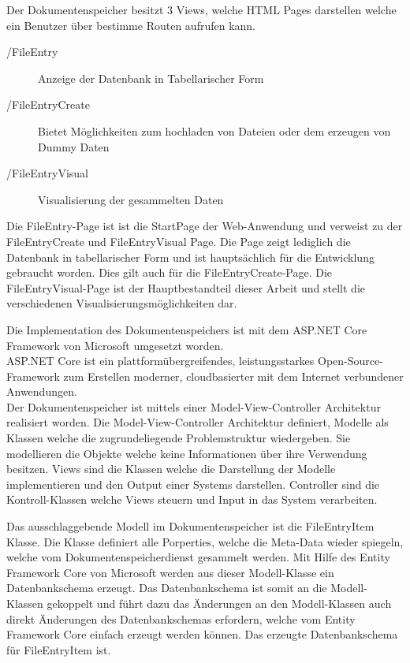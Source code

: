 \documentclass[
    fontsize=12pt,
    headings=small,
    parskip=half,           %
    bibliography=totoc,
    numbers=noenddot,       %
    open=any,               %
    ]{scrreprt}
\begin{document}
Der Dokumentenspeicher besitzt 3 Views, welche HTML Pages darstellen welche ein Benutzer über bestimme Routen aufrufen kann. 

\begin{description}
\item[/FileEntry] Anzeige der Datenbank in Tabellarischer Form
\item[/FileEntryCreate] Bietet Möglichkeiten zum hochladen von Dateien oder dem erzeugen von Dummy Daten
\item[/FileEntryVisual] Visualisierung der gesammelten Daten
\end{description}

Die FileEntry-Page ist ist die StartPage der Web-Anwendung und verweist zu der FileEntryCreate und FileEntryVisual Page.
Die Page zeigt lediglich die Datenbank in tabellarischer Form und ist hauptsächlich für die Entwicklung gebraucht worden. 
Dies gilt auch für die FileEntryCreate-Page. 
Die FileEntryVisual-Page ist der Hauptbestandteil dieser Arbeit und stellt die verschiedenen Visualisierungsmöglichkeiten dar. 







Die Implementation des Dokumentenspeichers ist mit dem ASP.NET Core Framework von Microsoft umgesetzt worden. \\
\glqq ASP.NET Core ist ein plattformübergreifendes, leistungsstarkes Open-Source-Framework zum Erstellen moderner, cloudbasierter mit dem Internet verbundener Anwendungen.\grqq \\
Der Dokumentenspeicher ist mittels einer Model-View-Controller Architektur realisiert worden. Die Model-View-Controller Architektur definiert, Modelle als Klassen welche die zugrundeliegende Problemstruktur wiedergeben. Sie modellieren die Objekte welche keine Informationen über ihre Verwendung besitzen. 
Views sind die Klassen welche die Darstellung der Modelle implementieren und den Output einer Systems darstellen. Controller sind die Kontroll-Klassen welche Views steuern und Input in das System verarbeiten. 

Das ausschlaggebende Modell im Dokumentenspeicher ist die FileEntryItem Klasse. Die Klasse definiert alle Porperties, welche die Meta-Data wieder spiegeln, welche vom Dokumentenspeicherdienst gesammelt werden. Mit Hilfe des Entity Framework Core von Microsoft werden aus dieser Modell-Klasse ein Datenbankschema erzeugt. Das Datenbankschema ist somit an die Modell-Klassen gekoppelt und führt dazu das Änderungen an den Modell-Klassen auch direkt Änderungen des Datenbankschemas erfordern, welche vom Entity Framework Core einfach erzeugt werden können. Das erzeugte Datenbankschema für FileEntryItem ist.
\end{document}
